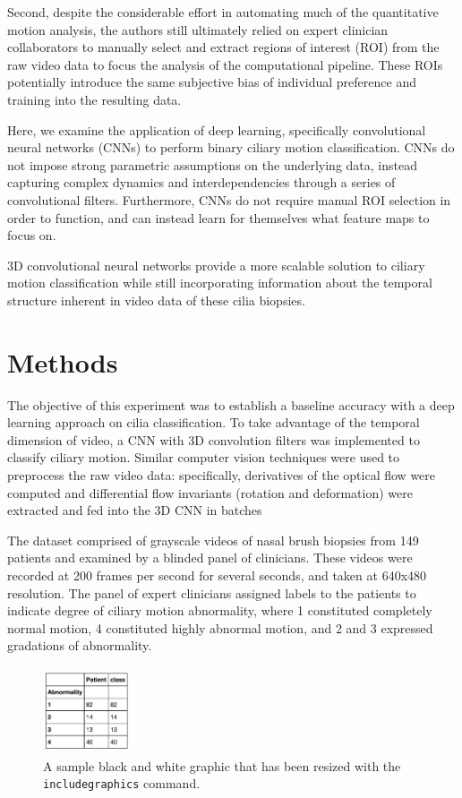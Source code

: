Second, despite the considerable effort in automating much of the quantitative motion analysis, the authors still ultimately relied on expert clinician collaborators to manually select and extract regions of interest (ROI) from the raw video data to focus the analysis of the computational pipeline. These ROIs potentially introduce the same subjective bias of individual preference and training into the resulting data.

Here, we examine the application of deep learning, specifically convolutional neural networks (CNNs) to perform binary ciliary motion classification. CNNs do not impose strong parametric assumptions on the underlying data, instead capturing complex dynamics and interdependencies through a series of convolutional filters. Furthermore, CNNs do not require manual ROI selection in order to function, and can instead learn for themselves what feature maps to focus on.

3D convolutional neural networks provide a more scalable solution to ciliary motion classification while still incorporating information about the temporal structure inherent in video data of these cilia biopsies.

\section{Methods}

The objective of this experiment was to establish a baseline accuracy with a deep learning approach on cilia classification. To take advantage of the temporal dimension of video, a CNN with 3D convolution filters was implemented to classify ciliary motion. Similar computer vision techniques \cite{quinn2011novel} were used to preprocess the raw video data: specifically, derivatives of the optical flow were computed and differential flow invariants (rotation and deformation) were extracted and fed into the 3D CNN in batches

The dataset comprised of grayscale videos of nasal brush biopsies from 149 patients and examined by a blinded panel of clinicians. These videos were recorded at 200 frames per second for several seconds, and taken at 640x480 resolution. The panel of expert clinicians assigned labels to the patients to indicate degree of ciliary motion abnormality, where 1 constituted completely normal motion, 4 constituted highly abnormal motion, and 2 and 3 expressed gradations of abnormality. 

\begin{figure}[H]
\includegraphics[height=1in, width=1in]{patient_label}
\caption{A sample black and white graphic that has
been resized with the \texttt{includegraphics} command.}
\end{figure}

